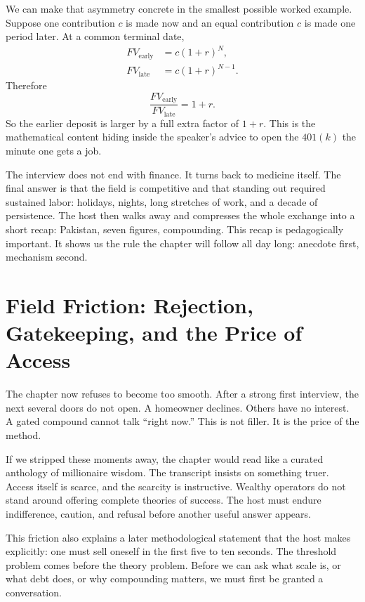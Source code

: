 We can make that asymmetry concrete in the smallest possible worked example. Suppose one contribution \(c\) is made now and an equal contribution \(c\) is made one period later. At a common terminal date,
\begin{align}
FV_{\mathrm{early}} &= c(1+r)^N,\\
FV_{\mathrm{late}}  &= c(1+r)^{N-1}.
\end{align}
Therefore
\begin{equation}
\frac{FV_{\mathrm{early}}}{FV_{\mathrm{late}}} = 1+r.
\end{equation}
So the earlier deposit is larger by a full extra factor of \(1+r\). This is the mathematical content hiding inside the speaker's advice to open the \(401(k)\) the minute one gets a job.

The interview does not end with finance. It turns back to medicine itself. The final answer is that the field is competitive and that standing out required sustained labor: holidays, nights, long stretches of work, and a decade of persistence. The host then walks away and compresses the whole exchange into a short recap: Pakistan, seven figures, compounding. This recap is pedagogically important. It shows us the rule the chapter will follow all day long: anecdote first, mechanism second.

\section{Field Friction: Rejection, Gatekeeping, and the Price of Access}

The chapter now refuses to become too smooth. After a strong first interview, the next several doors do not open. A homeowner declines. Others have no interest. A gated compound cannot talk ``right now.'' This is not filler. It is the price of the method.

If we stripped these moments away, the chapter would read like a curated anthology of millionaire wisdom. The transcript insists on something truer. Access itself is scarce, and the scarcity is instructive. Wealthy operators do not stand around offering complete theories of success. The host must endure indifference, caution, and refusal before another useful answer appears.

This friction also explains a later methodological statement that the host makes explicitly: one must sell oneself in the first five to ten seconds. The threshold problem comes before the theory problem. Before we can ask what scale is, or what debt does, or why compounding matters, we must first be granted a conversation.

